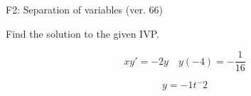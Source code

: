 \begin{exercise}
  \begin{exerciseTitle}F2: Separation of variables (ver. 66)\end{exerciseTitle}
  \begin{exerciseStatement}
    
Find the solution to the given IVP.

    
\[xy'= -2 y \hspace{1em} y( -4 ) = -\frac{1}{16}\]

  \end{exerciseStatement}
  \begin{exerciseAnswer}
    
\[y= -1 t^ -2\]

  \end{exerciseAnswer}
\end{exercise}